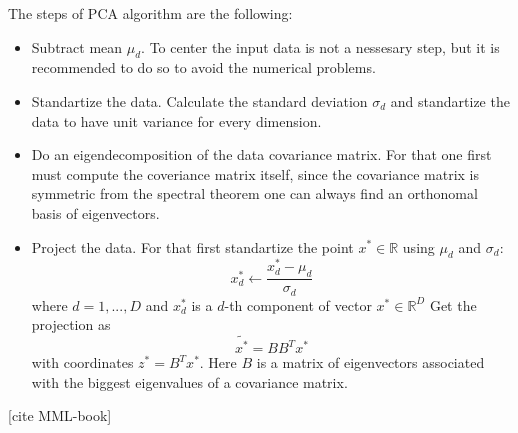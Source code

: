The steps of PCA algorithm are the following:
\begin{itemize}
    \item Subtract mean $\mu_d$. To center the input data is not a nessesary step, but it is recommended to do so to avoid the numerical problems.
    \item Standartize the data. Calculate the standard deviation $\sigma_d$ and standartize the data to have unit variance for every dimension. 
    \item Do an eigendecomposition of the data covariance matrix. For that one first must compute the coveriance matrix itself, since the covariance matrix is symmetric from the spectral theorem one can always find an orthonomal basis of eigenvectors. 
    \item Project the data. For that first standartize the point $x^* \in \mathbb{R}$ using $\mu_d$ and $\sigma_d$:
        \begin{equation}
            x^*_d  \leftarrow \frac{x^*_d - \mu_d}{\sigma_d}
        \end{equation}
        where $d = 1, ..., D$ and $x^*_d$ is a $d$-th component of vector $x^* \in \mathbb{R}^D$
    Get the projection as 
    \begin{equation}
        \tilde{x^*} = BB^T x^*
    \end{equation}
    with coordinates $z^* = B^Tx^*$. Here $B$ is a matrix of eigenvectors associated with the biggest eigenvalues of a covariance matrix.
\end{itemize}
[cite MML-book]